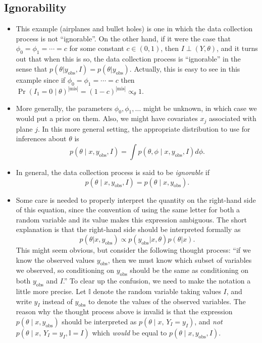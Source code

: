 \documentclass[12pt]{article}
\newcommand{\II}{\mathbb{I}}
\begin{document}
\subsection{Ignorability}
\begin{itemize}
\item This example (airplanes and bullet holes) is one in which the data collection process is not ``ignorable''. On the other hand, if it were the case that $\phi_0 = \phi_1 = \cdots = c$ for some constant $c \in (0,1)$, then 
$I \perp (Y,\theta)$,
and it turns out that when this is so, the data collection process is ``ignorable'' in the sense that $p(\theta | y_\text{obs},I) = p(\theta | y_\text{obs})$. Actually, this is easy to see in this example since if $\phi_0 = \phi_1 = \cdots = c$ then $\Pr(I_1 = 0 \mid \theta)^{|\text{mis} |} = (1 - c)^{|\text{mis} |} \propto_\theta 1$.
\item More generally, the parameters $\phi_0,\phi_1,\ldots$ might be unknown, in which case we would put a prior on them. Also, we might have covariates $x_j$ associated with plane $j$. In this more general setting, the appropriate distribution to use for inferences about $\theta$ is
$$ p(\theta \mid x,y_\text{obs},I) = \int p(\theta,\phi \mid x,y_\text{obs},I) d \phi. $$
\item In general, the data collection process is said to be \textit{ignorable} if
$$ p(\theta \mid x,y_\text{obs},I) = p(\theta \mid x,y_\text{obs}). $$
\item Some care is needed to properly interpret the quantity on the right-hand side of this equation, since the convention of using the same letter for both a random variable and its value makes this expression ambiguous. The short explanation is that the right-hand side should be interpreted formally as
$$ p(\theta | x,y_\text{obs}) \propto p(y_\text{obs} | x,\theta) p(\theta | x). $$
This might seem obvious, but consider the following thought process: ``if we know the observed values $y_\text{obs}$, then we must know which subset of variables we observed, so conditioning on $y_\text{obs}$ should be the same as conditioning on both $y_\text{obs}$ and $I$.'' To clear up the confusion, we need to make the notation a little more precise. Let $\II$ denote the random variable taking values $I$, and write $y_I$ instead of $y_\text{obs}$ to denote the values of the observed variables. The reason why the thought process above is invalid is that the expression $p(\theta \mid x,y_\text{obs})$ should be interpreted as $p(\theta \mid x,\, Y_I=y_I)$, and \textit{not} $p(\theta \mid x,\, Y_I=y_I,\II=I)$ which \textit{would} be equal to $p(\theta \mid x,y_\text{obs},I)$.

\end{itemize}
\end{document}
